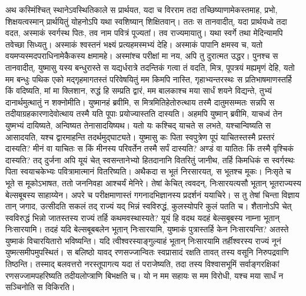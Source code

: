 \adhyAya
{}
\vakya अथ कस्मिंश्चित् स्थानेऽवस्थितिकाले स प्रार्थयत, यदा च विरराम तदा तच्छिष्याणामेकस्तमाह, प्रभो, शिक्षयत्वस्मान् प्रार्थयितुं योहनोऽपि यथा स्वशिष्यान् शिक्षितवान्।
\vakya ततः स तानवादीत्, यदा प्रार्थयध्वे तदा वदत, अस्माकं स्वर्गस्थ पितः, तव नाम पवित्रं पूज्यतां। तव राज्यमायातु। यथा स्वर्गे तथा मेदिन्यामपि तवेच्छा सिध्यतु।
\vakya अस्माकं श्वस्तनं भक्ष्यं प्रत्यहमस्मभ्यं देहि।
\vakya अस्माकं पापानि क्षमस्व च, यतो वयमप्यस्मदपराधिनामेकैकस्य क्षमामहे। अस्मांश्च परीक्षां मा नय, अपि तु दुरात्मत उद्धर।
\vakya पुनश्च स तानवादीत्, युष्मासु यस्य बन्धुरास्ते स यद्यर्धरात्रे तदन्तिकं गत्वा तं वदति, मित्र, पूपत्रयं मह्यमृणं देहि,
\vakya यतो मम बन्धुः पथिक एको मद्गृहमागतस्तं परिवेषयितुं मम किमपि नास्ति,
\vakya गृहाभ्यन्तरस्थः स प्रतिभाषमाणस्तर्हि किं वदिष्यति, मां मा क्लिशान, रुद्धं हि सम्प्रति द्वारं, मम बालकाश्च मया सार्धं शयने विद्यन्ते, तुभ्यं दानार्थमुत्थातुं न शक्नोमीति।
\vakya युष्मानहं ब्रवीमि, स मित्रमितिहेतोरुत्थाय तस्मै दातुमसम्मतः सन्नपि स तदीयाग्रहकारणादेवोत्थाय तस्मै यति पूपाः प्रयोज्यास्तति दास्यति।
\vakya अहमपि युष्मान् ब्रवीमि, याचध्वं तेन युष्मभ्यं दायिष्यते, अन्विष्यत तेनासादयिष्यथ।
\vakya यतो यः कश्चिद् याचते स लभते, यश्चान्विष्यति स आसादयति, यश्च द्वारमाहन्ति तदर्थमुद्घाट्यते।
\vakya युष्मासु कः पिता स्वपुत्रेण पूपं याचितस्तस्मै प्रस्तरं दास्यति? मीनं वा याचितः स किं मीनस्य परिवर्तेन तस्मै सर्पं दास्यति?
\vakya अण्डं वा यातितः किं तस्मै वृश्चिकं दास्यति?
\vakya तद् दुर्जना अपि यूयं चेत् स्वसन्तानेभ्यो हितदानानि वितरितुं जानीथ, तर्हि किमधिकं स स्वर्गस्थः पिता स्वयाचकेभ्यः पवित्रामात्मानं वितरिष्यति।
\vakya अथैकदा स भूतं निरसारयत्, स भूतश्च मूकः। निःसृते च भूते स मूकोऽभाषत, ततो जननिवहा आश्चर्यं मेनिरे।
\vakya तेषां केचित् त्ववदन्, निःसारयत्यसौ भूतान् भूतराज्यस्य बेल्सबूबस्य साहाय्येन।
\vakya अपरे च परीक्षमाणास्तं गगनादभिज्ञानस्य प्रदर्शनं ययाचिरे।
\vakya स तु तेषां चिन्ता विज्ञाय तान् जगाद, उत्सीदति सकलं तद् राज्यं यद् भिन्नं स्वविरुद्धं, कुलस्योपरि कुलं पतति च।
\vakya शैतानोऽपि चेत् स्वविरुद्धं भिन्नो जातस्तस्य राज्यं तर्हि कथमवस्थास्यते? यूयं हि वदथ यदहं बेल्सबूबस्य नाम्ना भूतान् निःसारयामि।
\vakya तदहं यदि बेल्सबूबबलेन भूतान् निःसारयामि, युष्माकं पुत्रास्तर्हि केन निःसारयन्ति? अतस्ते युष्माकं विचारयितारो भविष्यन्ति।
\vakya यदि त्वीश्वरस्याङ्गुल्याहं भूतान् निःसारयामि तर्हीश्वरस्य राज्यं नूनं युष्मत्समीपमुपस्थितं।
\vakya स बलिष्ठो यावद् रणसज्जान्वितः स्वप्रासादं रक्षति तावत् तस्य वसूनि निरुपद्रवाणि तिष्ठन्ति।
\vakya तस्माद् बलवत्तरो नरस्तूपागत्य यदा तं पराजेष्यति, तदा तस्य विश्वासभूमिं सर्वाङ्गरक्षिकां रणसज्जामपहरिष्यति तदीयलोप्त्राणि बिभक्षति च।
\vakya यो न मम सहायः स मम विरोधी, यश्च मया सार्धं न सञ्चिनोति स विकिरति।
